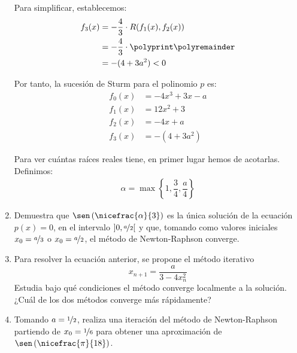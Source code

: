 \begin{ejercicio}
\begin{enumerate}
        Para simplificar, establecemos:
        \begin{align*}
            f_3(x) &= -\frac{4}{3}\cdot R(f_1(x), f_2(x))\\
            &= -\frac{4}{3}\cdot \polyprint\polyremainder\\
            &= -(4+3a^2)<0
        \end{align*}

        Por tanto, la sucesión de Sturm para el polinomio $p$ es:
        \begin{align*}
            f_0(x) &= -4x^3 + 3x - a\\
            f_1(x) &= 12x^2 + 3\\
            f_2(x) &= -4x+a\\
            f_3(x) &= -(4+3a^2)
        \end{align*}

        Para ver cuántas raíces reales tiene, en primer lugar hemos de acotarlas. Definimos:
        \begin{align*}
            \alpha=\max\left\{1,\dfrac{3}{4},\dfrac{a}{4}\right\}
        \end{align*}

        
        \item Demuestra que $\sen\left(\nicefrac{\alpha}{3}\right)$ es la única solución de la ecuación $p(x) = 0$, en el intervalo $\left]0,\nicefrac{a}{2}\right[$ y que, tomando como valores iniciales $x_0 = \nicefrac{a}{3}$ o $x_0 = \nicefrac{a}{2}$, el método de Newton-Raphson converge.
        \item Para resolver la ecuación anterior, se propone el método iterativo
        \[
            x_{n+1} = \frac{a}{3- 4x_n^2}
        \]
        Estudia bajo qué condiciones el método converge localmente a la solución. ¿Cuál de los dos métodos converge más rápidamente?
        \item Tomando $a = \nicefrac{1}{2}$, realiza una iteración del método de Newton-Raphson partiendo de $x_0 = \nicefrac{1}{6}$ para obtener una aproximación de $\sen\left(\nicefrac{\pi}{18}\right)$.
    \end{enumerate}
\end{ejercicio}


